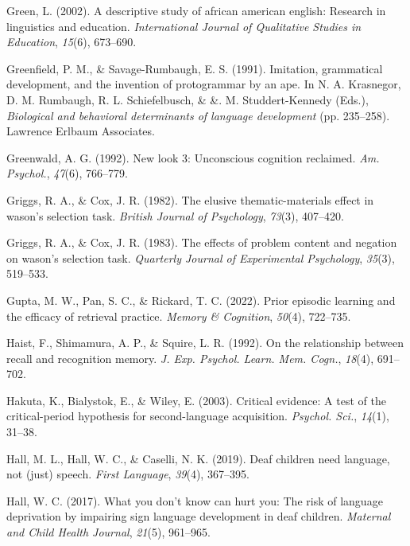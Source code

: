 \documentclass[
]{krantz}
\newlength{\cslhangindent}
\newenvironment{CSLReferences}[2] %
 {\begin{list}{}{%
  \setlength{\itemindent}{0pt}
  \setlength{\leftmargin}{0pt}
  \setlength{\parsep}{0pt}
  \ifodd #1
   \setlength{\leftmargin}{\cslhangindent}
   \setlength{\itemindent}{-1\cslhangindent}
  \fi
  \setlength{\itemsep}{#2\baselineskip}}}
 {\end{list}}
\begin{document}
\begin{CSLReferences}{1}{0}
Green, L. (2002). A descriptive study of african american english: Research in linguistics and education. \emph{International Journal of Qualitative Studies in Education}, \emph{15}(6), 673--690.

Greenfield, P. M., \& Savage-Rumbaugh, E. S. (1991). Imitation, grammatical development, and the invention of protogrammar by an ape. In N. A. Krasnegor, D. M. Rumbaugh, R. L. Schiefelbusch, \& \&. M. Studdert-Kennedy (Eds.), \emph{Biological and behavioral determinants of language development} (pp. 235--258). Lawrence Erlbaum Associates.

Greenwald, A. G. (1992). New look 3: Unconscious cognition reclaimed. \emph{Am. Psychol.}, \emph{47}(6), 766--779.

Griggs, R. A., \& Cox, J. R. (1982). The elusive thematic-materials effect in wason's selection task. \emph{British Journal of Psychology}, \emph{73}(3), 407--420.

Griggs, R. A., \& Cox, J. R. (1983). The effects of problem content and negation on wason's selection task. \emph{Quarterly Journal of Experimental Psychology}, \emph{35}(3), 519--533.

Gupta, M. W., Pan, S. C., \& Rickard, T. C. (2022). Prior episodic learning and the efficacy of retrieval practice. \emph{Memory \& Cognition}, \emph{50}(4), 722--735.

Haist, F., Shimamura, A. P., \& Squire, L. R. (1992). On the relationship between recall and recognition memory. \emph{J. Exp. Psychol. Learn. Mem. Cogn.}, \emph{18}(4), 691--702.

Hakuta, K., Bialystok, E., \& Wiley, E. (2003). Critical evidence: A test of the critical-period hypothesis for second-language acquisition. \emph{Psychol. Sci.}, \emph{14}(1), 31--38.

Hall, M. L., Hall, W. C., \& Caselli, N. K. (2019). Deaf children need language, not (just) speech. \emph{First Language}, \emph{39}(4), 367--395.

Hall, W. C. (2017). What you don't know can hurt you: The risk of language deprivation by impairing sign language development in deaf children. \emph{Maternal and Child Health Journal}, \emph{21}(5), 961--965.


\end{CSLReferences}
\end{document}
